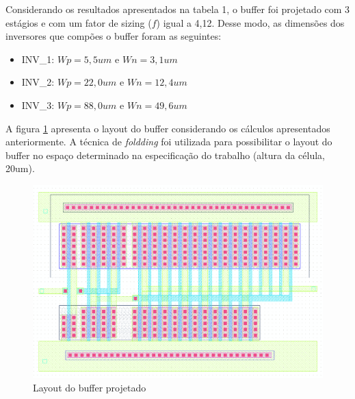 \documentclass[a4paper,10pt] {article}
\begin{document}
Considerando os resultados apresentados na tabela 1, o buffer foi projetado com 3 estágios e com um fator de sizing (\begin{math} f \end{math}) igual a 4,12. Desse modo, as dimensões dos inversores que compões o buffer foram as seguintes:

\begin{itemize}
\item INV\_1: \begin{math} Wp=5,5um \end{math} e \begin{math} Wn=3,1um \end{math}
\item INV\_2: \begin{math} Wp=22,0um \end{math} e \begin{math} Wn=12,4um \end{math}
\item INV\_3: \begin{math} Wp=88,0um \end{math} e \begin{math} Wn=49,6um \end{math}
\end{itemize}

A figura \ref{fig:buffer} apresenta o layout do buffer considerando os cálculos apresentados anteriormente. A técnica de \textit{foldding} foi utilizada para possibilitar o layout do buffer no espaço determinado na especificação do trabalho (altura da célula, 20um).

\begin{figure} [h]
	\label{fig:buffer}
	\centering
	\includegraphics[scale=0.25]{layout_buffer.png}
	\caption{Layout do buffer projetado}
\end{figure}
\end{document}
